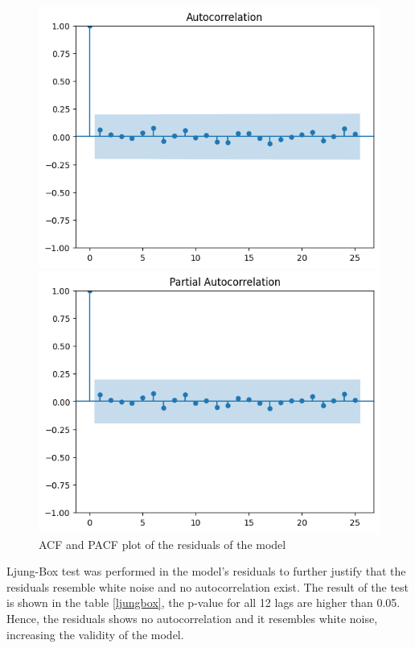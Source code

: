 \documentclass[11pt]{article}
\begin{document}
\begin{figure}[h]
    \caption{ACF and PACF plot of the residuals of the model}
    \centering
    \begin{minipage}{0.48\textwidth}
        \centering
        \includegraphics[width=\linewidth]{resid_acf.png}
    \end{minipage}
    \hfill
    \begin{minipage}{0.48\textwidth}
        \centering
        \includegraphics[width=\linewidth]{resid_pacf.png}
    \end{minipage}
    \label{resid_acf_pacf}
\end{figure}

Ljung-Box test was performed in the model's residuals to further justify that the residuals resemble white noise and no autocorrelation exist. The result of the test is shown in the table \ref{ljungbox}, the p-value for all 12 lags are higher than 0.05. Hence, the residuals shows no autocorrelation and it resembles white noise, increasing the validity of the model. 
\end{document}
